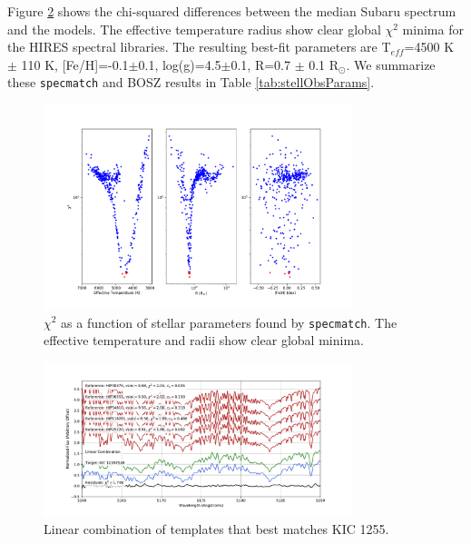 \documentclass[preprint]{aastex61}
\begin{document}
Figure \ref{fig:specMatch} shows the chi-squared differences between the median Subaru spectrum and the models.
The effective temperature radius show clear global $\chi^2$ minima for the HIRES spectral libraries.
The resulting best-fit parameters are T$_{eff}$=4500 K $\pm$ 110 K, [Fe/H]=-0.1$\pm$0.1, log(g)=4.5$\pm$0.1, R=0.7 $\pm$ 0.1 R$_\odot$.
We summarize these \texttt{specmatch} and BOSZ results in Table \ref{tab:stellObsParams}.

\begin{figure}[!hbtp]
\begin{centering}
\includegraphics[width=0.8\textwidth]{images/subaru/spec_chi_min.pdf}
\caption{$\chi^2$ as a function of stellar parameters found by \texttt{specmatch}.
The effective temperature and radii show clear global minima.}\label{fig:specMatch}
\end{centering}
\end{figure}

\begin{figure}[!hbtp]
\begin{centering}
\includegraphics[width=0.8\textwidth]{images/subaru/lincomb_kic1255.pdf}
\caption{Linear combination of templates that best matches KIC 1255.}\label{fig:specMatch}
\end{centering}
\end{figure}
\end{document}
